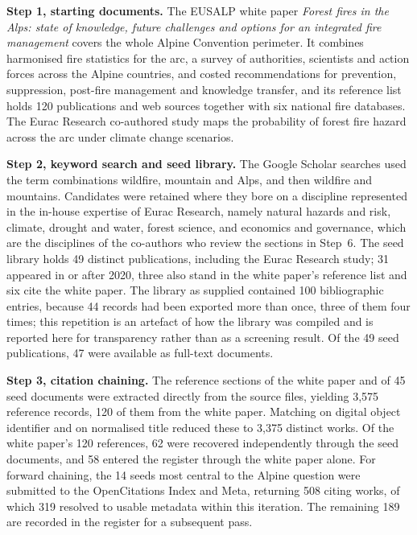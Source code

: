 \documentclass[11pt,a4paper]{article}
\begin{document}
\textbf{Step 1, starting documents.} The EUSALP white paper \emph{Forest fires in the Alps: state of knowledge, future challenges and options for an integrated fire management} \citep{muller_forest_2020} covers the whole Alpine Convention perimeter. It combines harmonised fire statistics for the arc, a survey of authorities, scientists and action forces across the Alpine countries, and costed recommendations for prevention, suppression, post-fire management and knowledge transfer, and its reference list holds 120 publications and web sources together with six national fire databases. The Eurac Research co-authored study \citep{gerberding_mapping_2025} maps the probability of forest fire hazard across the arc under climate change scenarios.

\textbf{Step 2, keyword search and seed library.} The Google Scholar searches used the term combinations wildfire, mountain and Alps, and then wildfire and mountains. Candidates were retained where they bore on a discipline represented in the in-house expertise of Eurac Research, namely natural hazards and risk, climate, drought and water, forest science, and economics and governance, which are the disciplines of the co-authors who review the sections in Step~6. The seed library holds 49 distinct publications, including the Eurac Research study; 31 appeared in or after 2020, three also stand in the white paper's reference list and six cite the white paper. The library as supplied contained 100 bibliographic entries, because 44 records had been exported more than once, three of them four times; this repetition is an artefact of how the library was compiled and is reported here for transparency rather than as a screening result. Of the 49 seed publications, 47 were available as full-text documents.

\textbf{Step 3, citation chaining.} The reference sections of the white paper and of 45 seed documents were extracted directly from the source files, yielding 3{,}575 reference records, 120 of them from the white paper. Matching on digital object identifier and on normalised title reduced these to 3{,}375 distinct works. Of the white paper's 120 references, 62 were recovered independently through the seed documents, and 58 entered the register through the white paper alone. For forward chaining, the 14 seeds most central to the Alpine question were submitted to the OpenCitations Index and Meta, returning 508 citing works, of which 319 resolved to usable metadata within this iteration. The remaining 189 are recorded in the register for a subsequent pass.
\end{document}
